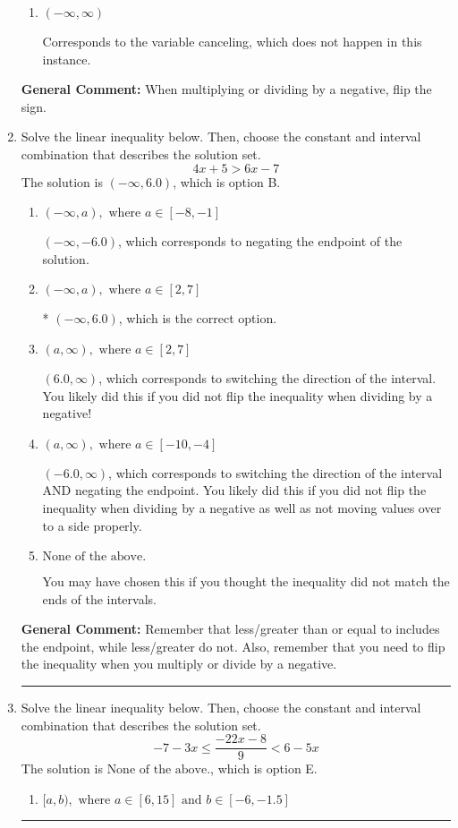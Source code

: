 \documentclass{extbook}[14pt]
\newcommand{\litem}[1]{\item #1

\rule{\textwidth}{0.4pt}}
\begin{document}
\begin{enumerate}
{\begin{enumerate}[label=\Alph*.]
Corresponds to inverting the inequality and negating the solution.
\item \( (-\infty, \infty) \)

Corresponds to the variable canceling, which does not happen in this instance.
\end{enumerate}

\textbf{General Comment:} When multiplying or dividing by a negative, flip the sign.
}
\litem{
Solve the linear inequality below. Then, choose the constant and interval combination that describes the solution set.
\[ 4x + 5 > 6x -7 \]The solution is \( (-\infty, 6.0) \), which is option B.\begin{enumerate}[label=\Alph*.]
\item \( (-\infty, a), \text{ where } a \in [-8, -1] \)

 $(-\infty, -6.0)$, which corresponds to negating the endpoint of the solution.
\item \( (-\infty, a), \text{ where } a \in [2, 7] \)

* $(-\infty, 6.0)$, which is the correct option.
\item \( (a, \infty), \text{ where } a \in [2, 7] \)

 $(6.0, \infty)$, which corresponds to switching the direction of the interval. You likely did this if you did not flip the inequality when dividing by a negative!
\item \( (a, \infty), \text{ where } a \in [-10, -4] \)

 $(-6.0, \infty)$, which corresponds to switching the direction of the interval AND negating the endpoint. You likely did this if you did not flip the inequality when dividing by a negative as well as not moving values over to a side properly.
\item \( \text{None of the above}. \)

You may have chosen this if you thought the inequality did not match the ends of the intervals.
\end{enumerate}

\textbf{General Comment:} Remember that less/greater than or equal to includes the endpoint, while less/greater do not. Also, remember that you need to flip the inequality when you multiply or divide by a negative.
}
\litem{
Solve the linear inequality below. Then, choose the constant and interval combination that describes the solution set.
\[ -7 - 3 x \leq \frac{-22 x - 8}{9} < 6 - 5 x \]The solution is \( \text{None of the above.} \), which is option E.\begin{enumerate}[label=\Alph*.]
\item \( [a, b), \text{ where } a \in [6, 15] \text{ and } b \in [-6, -1.5] \)


\end{enumerate}}
\end{enumerate}
\end{document}
